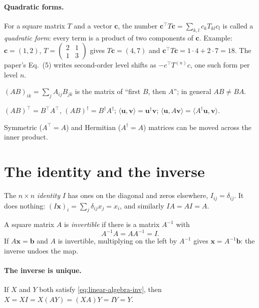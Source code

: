 \paragraph{Quadratic forms.} For a square matrix $T$ and a vector $\bm c$, the number $\bm c^\top T\bm c=\sum_{k,l}c_kT_{kl}c_l$ is called a \emph{quadratic form}: every term is a product of two components of $\bm c$. Example: $\bm c=(1,2)$, $T=\begin{pmatrix}2&1\\1&3\end{pmatrix}$ gives $T\bm c=(4,7)$ and $\bm c^\top T\bm c=1\cdot4+2\cdot7=18$. The paper's Eq.~(5) writes second-order level shifts as $-c^\top T^{(n)}c$, one such form per level $n$.

\begin{keyideas}
\item $(AB)_{ik}=\sum_jA_{ij}B_{jk}$ is the matrix of ``first $B$, then $A$''; in general $AB\ne BA$.
\item $(AB)^\top=B^\top A^\top$, $(AB)^\dagger=B^\dagger A^\dagger$; $\langle\bm u,\bm v\rangle=\bm u^\dagger\bm v$; $\langle\bm u,A\bm v\rangle=\langle A^\dagger\bm u,\bm v\rangle$.
\item Symmetric ($A^\top=A$) and Hermitian ($A^\dagger=A$) matrices can be moved across the inner product.
\end{keyideas}

\section{The identity and the inverse}\label{sec:linear-algebra-inverse}

The $n\times n$ \emph{identity} $I$ has ones on the diagonal and zeros elsewhere, $I_{ij}=\delta_{ij}$. It does nothing: $(I\bm x)_i=\sum_j\delta_{ij}x_j=x_i$, and similarly $IA=AI=A$.

A square matrix $A$ is \emph{invertible} if there is a matrix $A^{-1}$ with
\begin{equation}
A^{-1}A=AA^{-1}=I .
\label{eq:linear-algebra-inv}
\end{equation}
If $A\bm x=\bm b$ and $A$ is invertible, multiplying on the left by $A^{-1}$ gives $\bm x=A^{-1}\bm b$: the inverse undoes the map.

\paragraph{The inverse is unique.} If $X$ and $Y$ both satisfy \cref{eq:linear-algebra-inv}, then $X=XI=X(AY)=(XA)Y=IY=Y$.

